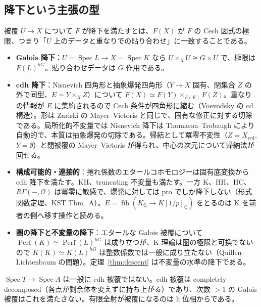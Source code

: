 \documentclass[11pt,a4paper]{ltjsarticle}
\numberwithin{equation}{section}
\theoremstyle{plain}
\theoremstyle{definition}
\theoremstyle{definition}
\newcommand{\Perf}{\operatorname{Perf}}
\newcommand{\Spec}{\operatorname{Spec}}
\newcommand{\Q}{\mathbb{Q}}
\begin{document}
\subsection{降下という主張の型}
被覆 $U\to X$ について $F$ が降下を満たすとは、$F(X)$ が $F$ の Cech 図式の極限、つまり「$U$ 上のデータと重なりでの貼り合わせ」に一致することである。
\begin{itemize}
  \item \textbf{Galois 降下}：$U=\Spec L\to X=\Spec K$ なら $U\times_XU\cong G\times U$ で、極限は $F(L)^{hG}$。貼り合わせデータは $G$ 作用である。
  \item \textbf{cdh 降下}：Nisnevich 四角形と抽象爆発四角形（$Y\to X$ 固有、閉集合 $Z$ の外で同型、$E=Y\times_XZ$）について $F(X)\simeq F(Y)\times_{F(E)}F(Z)$。重なりの情報が $E$ に集約されるので Cech 条件が四角形に縮む（Voevodsky の cd 構造）。形は Zariski の Mayer--Vietoris と同じで、固有な修正に対する切除である。局所化的不変量では Nisnevich 降下は Thomason--Trobaugh により自動的で、本質は抽象爆発の切除である。帰結として冪零不変性（$Z=X_{\mathrm{red}}$, $Y=\emptyset$）と閉被覆の Mayer--Vietoris が得られ、中心の次元について帰納法が回せる。
  \item \textbf{構成可能的・連接的}：捲れ係数のエタールコホモロジーは固有底変換から cdh 降下を満たす。KH、truncating 不変量も満たす。一方 K、HH、HC、$R\Gamma(-,\mathcal O)$ は冪零に敏感で、爆発に対しては pro でしか降下しない（形式関数定理、KST Thm.~A）。$E=\operatorname{fib}(K_\Q\to K[1/p]_\Q)$ をとるのは K を前者の側へ移す操作と読める。
  \item \textbf{圏の降下と不変量の降下}：エタールな Galois 被覆について $\Perf(K)\simeq\Perf(L)^{hG}$ は成り立つが、K 理論は圏の極限と可換でないので $K(K)\simeq K(L)^{hG}$ は整数係数では一般に成り立たない（Quillen--Lichtenbaum の問題）。定理~\ref{thm:descent} は不変量の水準の降下である。
\end{itemize}
$\Spec T\to\Spec A$ は一般に cdh 被覆ではない。cdh 被覆は completely decomposed（各点が剰余体を変えずに持ち上がる）であり、次数 $>1$ の Galois 被覆はこれを満たさない。有限全射が被覆になるのは h 位相からである。
\end{document}

